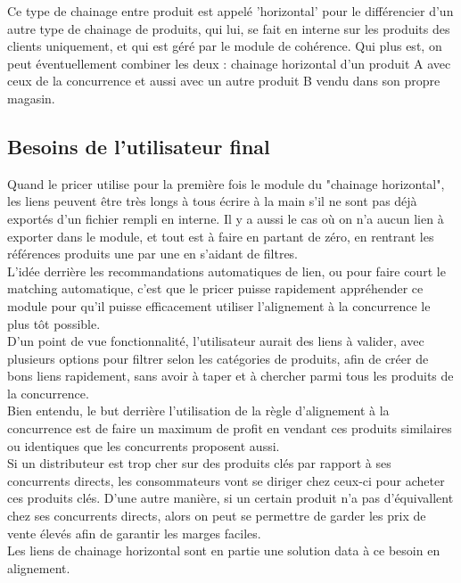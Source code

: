 \documentclass{rapportCS}
\begin{document}
Ce type de chainage entre produit est appelé 'horizontal' pour le différencier d'un autre type de 
chainage de produits, qui lui, se fait en interne sur les produits des clients uniquement, et qui est
géré par le module de cohérence. Qui plus est, on peut éventuellement combiner les deux : chainage
horizontal d'un produit A avec ceux de la concurrence et aussi avec un autre produit B vendu dans son 
propre magasin. \\

\subsection{Besoins de l'utilisateur final}
Quand le pricer utilise pour la première fois le module du "chainage horizontal",
les liens peuvent être très longs à tous écrire à la main s'il ne sont pas déjà exportés d'un fichier
rempli en interne. Il y a aussi le cas où on n'a aucun lien à exporter dans le module, et tout est à
faire en partant de zéro, en rentrant les références produits une par une en s'aidant de filtres.\\

L'idée derrière les recommandations automatiques de lien, ou pour faire court le matching automatique,
c'est que le pricer puisse rapidement appréhender ce module pour qu'il puisse efficacement utiliser
l'alignement à la concurrence le plus tôt possible.\\
D'un point de vue fonctionnalité, l'utilisateur aurait des liens à valider, 
avec plusieurs options pour filtrer selon les catégories de produits, afin de créer de bons liens
rapidement, sans avoir à taper et à chercher parmi tous les produits de la concurrence.\\

Bien entendu, le but derrière l'utilisation de la règle d'alignement à la concurrence est de faire un
maximum de profit en vendant ces produits similaires ou identiques que les concurrents
proposent aussi. \\
Si un distributeur est trop cher sur des produits clés par rapport à ses concurrents directs,
les consommateurs vont se diriger chez ceux-ci pour acheter ces produits clés. 
D'une autre manière, si un certain produit n'a pas d'équivallent chez ses concurrents directs,
alors on peut se permettre de garder les prix de vente élevés afin de garantir les marges faciles. \\
Les liens de chainage horizontal sont en partie une solution data à ce besoin en alignement.
\end{document}
